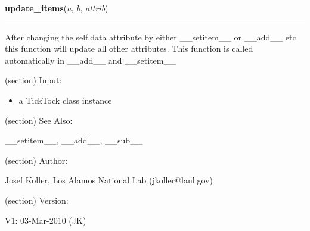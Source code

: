 \hspace{.8\funcindent}\begin{boxedminipage}{\funcwidth}

    \raggedright \textbf{update\_items}(\textit{a}, \textit{b}, \textit{attrib})

    \vspace{-1.5ex}

    \rule{\textwidth}{0.5\fboxrule}
\setlength{\parskip}{2ex}
    After changing the self.data attribute by either \_\_setitem\_\_ or 
    \_\_add\_\_ etc this function will update all other attributes. This 
    function is called automatically in \_\_add\_\_ and \_\_setitem\_\_

    (section) Input:

      \begin{itemize}
      \setlength{\parskip}{0.6ex}
        \item a TickTock class instance

      \end{itemize}

    (section) See Also:

      \_\_setitem\_\_, \_\_add\_\_, \_\_sub\_\_

    (section) Author:

      Josef Koller, Los Alamos National Lab (jkoller@lanl.gov)

    (section) Version:

      V1: 03-Mar-2010 (JK)

\setlength{\parskip}{1ex}
    \end{boxedminipage}

    \label{spacepy:spacetime:TickTock:convert}

    \vspace{0.5ex}

